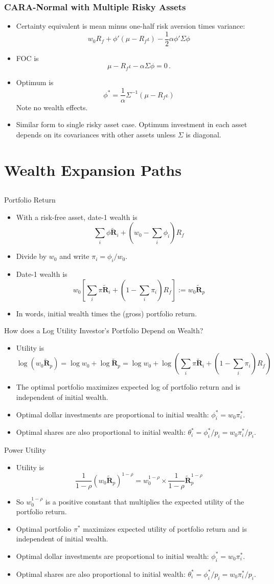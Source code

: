 \documentclass[10pt]{beamer}
\newcommand{\bi}{\begin{itemize}}
\newcommand{\ei}{\end{itemize}}
\newcommand{\im}{\item}
\newcommand{\bfr}{\begin{frame}}
\newcommand{\tR}{\widetilde{\mathbf{R}}}
\begin{document}
\bfr\frametitle{CARA-Normal with Multiple Risky Assets}
\bi
\im Certainty equivalent is mean minus one-half risk aversion times variance:
$$w_0R_f + \phi'(\mu-R_f\iota) - \frac{1}{2}\alpha \phi'\Sigma\phi$$
\im FOC is
$$\mu-R_f\iota - \alpha\Sigma\phi = 0\,.$$
\im Optimum is
$$\phi^* = \frac{1}{\alpha}\Sigma^{-1}(\mu-R_f\iota)$$
Note no wealth effects.
\im Similar form to single risky asset case.  Optimum investment in each asset depends on its covariances with other assets unless $\Sigma$ is diagonal.
\ei
\end{frame}

\section{Wealth Expansion Paths}
\subsection{} 

\begin{frame}{Portfolio Return}
   \bi 
   \im With a risk-free asset, date-1 wealth is 
$$\sum_i \phi \tR_i + \left(w_0- \sum_i \phi_i\right)R_f$$
\im Divide by $w_0$ and write $\pi_i = \phi_i/w_0$.
\im Date-1 wealth is
$$w_0 \left[\sum_i \pi \tR_i + \left(1- \sum_i \pi_i\right)R_f\right] := w_0 \tR_p$$
\im In words, initial wealth times the (gross) portfolio return.
    \ei
\end{frame}

\begin{frame}{How does a Log Utility Investor's Portfolio Depend on Wealth?}
    \bi 
    \im Utility is
    $$\log (w_0\tR_p) = \log w_0 + \log \tR_p = \log w_0 + \log\left(\sum_i \pi \tR_i + \left(1- \sum_i \pi_i\right)R_f\right)$$
     \im The optimal portfolio maximizes expected log of portfolio return and is independent of initial wealth.
    \im Optimal dollar investments are proportional to initial wealth: $\phi_i^* = w_0 \pi_i^*$.
    \im Optimal shares are also proportional to initial wealth: $\theta_i^* = \phi_i^*/p_i = w_0 \pi_i^*/p_i$.
    \ei
\end{frame}

\begin{frame}{Power Utility}
    \bi
    \im Utility is
    $$\frac{1}{1-\rho} (w_0 \tR_p)^{1-\rho} = w_0^{1-\rho} \times \frac{1}{1-\rho} \tR_p^{1-\rho}$$
    \im So $w_0^{1-\rho}$ is a positive constant that multiplies the expected utility of the portfolio return.
    \im Optimal portfolio $\pi^*$ maximizes expected utility of portfolio return and is independent of initial wealth.
    \im Optimal dollar investments are proportional to initial wealth: $\phi_i^* = w_0 \pi_i^*$.
    \im Optimal shares are also proportional to initial wealth: $\theta_i^* = \phi_i^*/p_i = w_0 \pi_i^*/p_i$.
\ei \end{frame}
\end{document}
